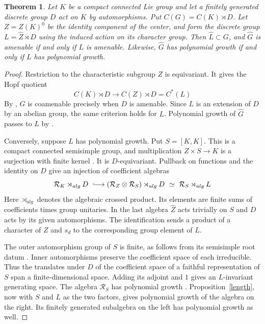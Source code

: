 \documentclass[11pt,a4paper]{article}
\newtheorem{thm}{Theorem}[section]
\theoremstyle{remark}
\begin{document}
\begin{thm}\label{centralgrowth}
Let $K$ be a compact connected Lie group and let a finitely generated
discrete group $D$ act on $K$ by automorphisms. Put $C(G)=C(K)\rtimes D$.
Let $Z=Z(K)^0$ be the identity component of the center, and form the
discrete group $L=\widehat Z\rtimes D$ using the induced action on its character
group. Then $\widehat L\subset G$, and $\widehat G$ is amenable if and
only if $L$ is amenable. Likewise,
$\widehat G$ has polynomial growth if and only if $L$ has polynomial growth.
\end{thm}
\begin{proof}
Restriction to the characteristic subgroup $Z$ is equivariant. It gives
the Hopf quotient
\[
 C(K)\rtimes D\longrightarrow C(Z)\rtimes D=C^*(L)
\]
By \cite[Corollary~6.4]{fmp}, $G$ is coamenable precisely when $D$ is
amenable. Since $L$ is an extension of $D$ by an abelian group, the same
criterion holds for $L$. Polynomial growth of $\widehat G$ passes to
$L$ by \cite[Proposition~4.1]{dpr}.

Conversely, suppose $L$ has polynomial growth. Put $S=[K,K]$. This is a
compact connected semisimple group, and multiplication
$Z\times S\to K$ is a surjection with finite kernel \cite{btd}. It is
$D$-equivariant. Pullback on functions and the identity on $D$ give an
injection of coefficient algebras
\[
 \mathcal R_K\rtimes_{alg}D
 \ \lhook\joinrel\longrightarrow (\mathcal R_Z\otimes\mathcal R_S)\rtimes_{alg}D
 \ \simeq\ \mathcal R_S\rtimes_{alg}L
\]
Here $\rtimes_{alg}$ denotes the algebraic crossed product. Its elements
are finite sums of coefficients times group unitaries.
In the last algebra $\widehat Z$ acts trivially on $S$ and $D$ acts by
its given automorphisms. The identification sends a product of a character
of $Z$ and $s_d$ to the corresponding group element of $L$.

The outer automorphism group of $S$ is finite, as follows from its
semisimple root datum \cite{btd}. Inner automorphisms preserve the
coefficient space of each irreducible. Thus the translates under $D$ of
the coefficient space of a faithful representation of $S$ span a
finite-dimensional space. Adding its adjoint and $1$ gives an
$L$-invariant generating space. The algebra $\mathcal R_S$ has
polynomial growth \cite{dpr}. Proposition~\ref{length}, now with $S$
and $L$ as the two factors, gives polynomial growth of the algebra on
the right. Its finitely generated subalgebra on the left has polynomial
growth as well.
\end{proof}
\end{document}
